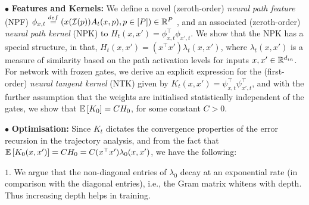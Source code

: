 \documentclass{article}
\begin{document}
$\bullet$ \textbf{Features and Kernels:}  We define a novel (zeroth-order) \emph{neural path feature} (NPF) $\phi_{x,t}\stackrel{def}=\left( x(\mathcal{I}(p))A_t(x,p),p\in[P]\right)\in \mathbb{R}^P$ , and an associated (zeroth-order) \emph{neural path kernel} (NPK) to $H_t(x,x')=\phi^\top_{x,t}\phi_{x',t}$. We show that the NPK has a special structure, in that, $H_t(x,x')=(x^\top x')\lambda_t(x,x')$, where $\lambda_t(x,x')$ is a measure of similarity based on the path activation levels for inputs $x,x'\in\mathbb{R}^{d_{in}}$. For network with frozen gates, we derive an explicit expression for  the (first-order) \emph{neural tangent kernel} (NTK) given by $K_t(x,x')=\psi^\top_{x,t}\psi^\top_{x',t}$, and with the further assumption that the
weights are initialised statistically independent of the gates, we show that $\mathbb{E}\left[K_0\right]=C H_0$, for some constant $C>0$.


$\bullet$ \textbf{Optimisation:} Since $K_t$ dictates the convergence properties of the error recursion in the trajectory analysis, and from the fact that $\mathbb{E}\left[K_0(x,x')\right]=C H_0=C (x^\top x')\lambda_0(x,x')$, we have the following:

$1.$ We argue that the non-diagonal entries of $\lambda_0$ decay at an exponential rate (in comparison with the diagonal entries), i.e., the Gram matrix whitens with depth. Thus increasing depth helps in training.
\end{document}

